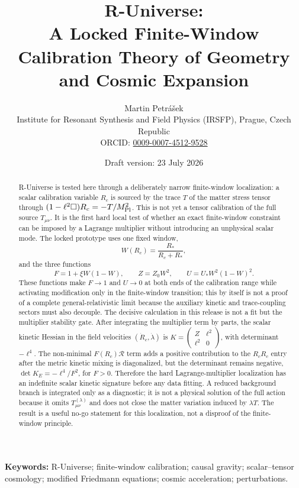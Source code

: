\documentclass[12pt,a4paper]{article}
\title{\textbf{R-Universe:\\
A Locked Finite-Window Calibration Theory of Geometry and Cosmic Expansion}}
\author{
Martin Petrášek\\
\small Institute for Resonant Synthesis and Field Physics (IRSFP), Prague, Czech Republic\\
\small ORCID: \href{https://orcid.org/0009-0007-4512-9528}{0009-0007-4512-9528}
}
\date{Draft version: 23 July 2026}
\begin{document}
\maketitle

\begin{abstract}
R-Universe is tested here through a deliberately narrow finite-window localization: a scalar calibration variable $R_c$ is sourced by the trace $T$ of the matter stress tensor through $(1-\ell^2\Box)R_c=-T/M_{\rm Pl}^2$. This is not yet a tensor calibration of the full source $T_{\mu\nu}$. It is the first hard local test of whether an exact finite-window constraint can be imposed by a Lagrange multiplier without introducing an unphysical scalar mode. The locked prototype uses one fixed window,
\begin{equation*}
W(R_c)=\frac{R_*}{R_c+R_*},
\end{equation*}
and the three functions
\begin{equation*}
F=1+\xi W(1-W),\qquad Z=Z_0W^2,
\qquad U=U_*W^2(1-W)^2.
\end{equation*}
These functions make $F\to1$ and $U\to0$ at both ends of the calibration range while activating modification only in the finite-window transition; this by itself is not a proof of a complete general-relativistic limit because the auxiliary kinetic and trace-coupling sectors must also decouple. The decisive calculation in this release is not a fit but the multiplier stability gate. After integrating the multiplier term by parts, the scalar kinetic Hessian in the field velocities $(\dot R_c,\dot\lambda)$ is $K=\begin{pmatrix}Z&\ell^2\\\ell^2&0\end{pmatrix}$, with determinant $-\ell^4$. The non-minimal $F(R_c)\mathcal R$ term adds a positive contribution to the $R_cR_c$ entry after the metric kinetic mixing is diagonalized, but the determinant remains negative, $\det K_E=-\ell^4/F^2$, for $F>0$. Therefore the hard Lagrange-multiplier localization has an indefinite scalar kinetic signature before any data fitting. A reduced background branch is integrated only as a diagnostic; it is not a physical solution of the full action because it omits $T_{\mu\nu}^{(\lambda)}$ and does not close the matter variation induced by $\lambda T$. The result is a useful no-go statement for this localization, not a disproof of the finite-window principle.
\end{abstract}

\noindent\textbf{Keywords:} R-Universe; finite-window calibration; causal gravity; scalar--tensor cosmology; modified Friedmann equations; cosmic acceleration; perturbations.
\end{document}

